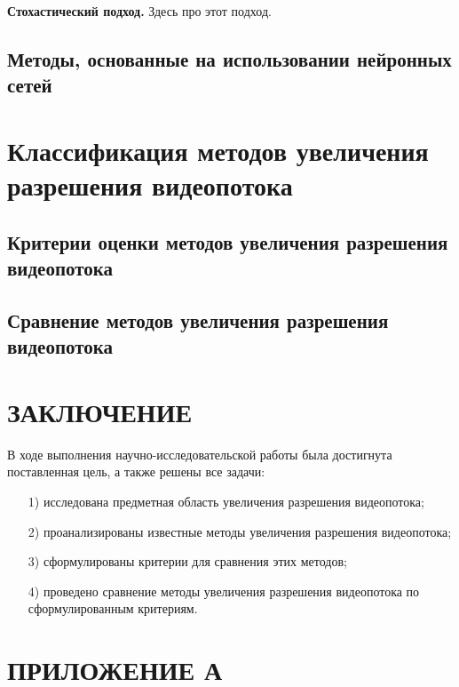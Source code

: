 \documentclass{bmstu}
\begin{document}
\textbf{Стохастический подход.} 
Здесь про этот подход.

\section{Методы, основанные на использовании нейронных сетей}

\chapter{Классификация методов увеличения разрешения видеопотока}

\section{Критерии оценки методов увеличения разрешения видеопотока}

\section{Сравнение методов увеличения разрешения видеопотока}

{\centering \chapter*{ЗАКЛЮЧЕНИЕ}}

В ходе выполнения научно-исследовательской работы была достигнута поставленная цель, а также решены все задачи:
\begin{enumerate}
\item[1)] исследована предметная область увеличения разрешения видеопотока;
\item[2)] проанализированы известные методы увеличения разрешения видеопотока;
\item[3)] сформулированы критерии для сравнения этих методов;
\item[4)] проведено сравнение методы увеличения разрешения видеопотока по сформулированным критериям.
\end{enumerate}

{\centering {\center\printbibliography[title=СПИСОК ИСПОЛЬЗОВАННЫХ ИСТОЧНИКОВ]}}

{\centering \chapter*{ПРИЛОЖЕНИЕ А}}
\end{document}
